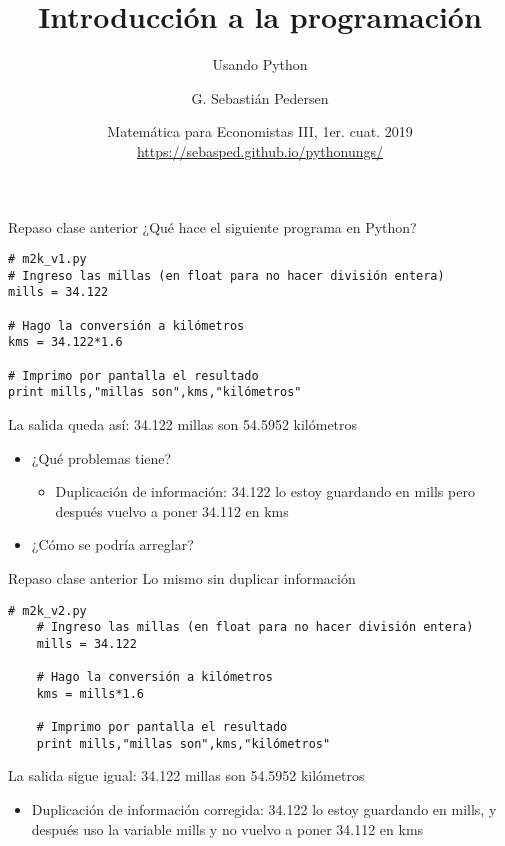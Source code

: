 \documentclass[9pt]{beamer}
\title[Intro Prog] %
{Introducción a la programación}
\subtitle
{Usando Python}
\author[SP]
{G. Sebastián Pedersen}%
\institute[UNGS] %
{
  Instituto de Industria\\
  Universidad Nacional de General Sarmiento
}
\date[] %
{Matemática para Economistas III, 1er. cuat. 2019\\ 
\vspace{.5cm}
\url{https://sebasped.github.io/pythonungs/}
}
\begin{document}
\begin{frame}
  \titlepage
\end{frame}


\begin{frame}[fragile]{Repaso clase anterior}
¿Qué hace el siguiente programa en Python?
\footnotesize{\begin{verbatim}
# m2k_v1.py
# Ingreso las millas (en float para no hacer división entera)
mills = 34.122

# Hago la conversión a kilómetros
kms = 34.122*1.6

# Imprimo por pantalla el resultado
print mills,"millas son",kms,"kilómetros"
\end{verbatim}}\pause
La salida queda así: 34.122 millas son 54.5952 kilómetros\pause
\begin{itemize}
	\item ¿Qué problemas tiene?\pause 
		\begin{itemize}
			\item \alert{Duplicación de información:} 34.122 lo estoy guardando en mills pero después vuelvo a poner 34.112 en kms
		\end{itemize}\pause
	\item ¿Cómo se podría arreglar?
\end{itemize}

\end{frame}



\begin{frame}[fragile]{Repaso clase anterior}
Lo mismo \alert{sin duplicar información}
\footnotesize{\begin{verbatim}
# m2k_v2.py
	# Ingreso las millas (en float para no hacer división entera)
	mills = 34.122
	
	# Hago la conversión a kilómetros
	kms = mills*1.6
	
	# Imprimo por pantalla el resultado
	print mills,"millas son",kms,"kilómetros"
	\end{verbatim}}\pause
La salida sigue igual: 34.122 millas son 54.5952 kilómetros\pause
\begin{itemize}
	\item \alert{Duplicación de información corregida:} 34.122 lo estoy guardando en mills, y después uso la variable mills y no vuelvo a poner 34.112 en kms
	
\end{itemize}

\end{frame}
\end{document}
